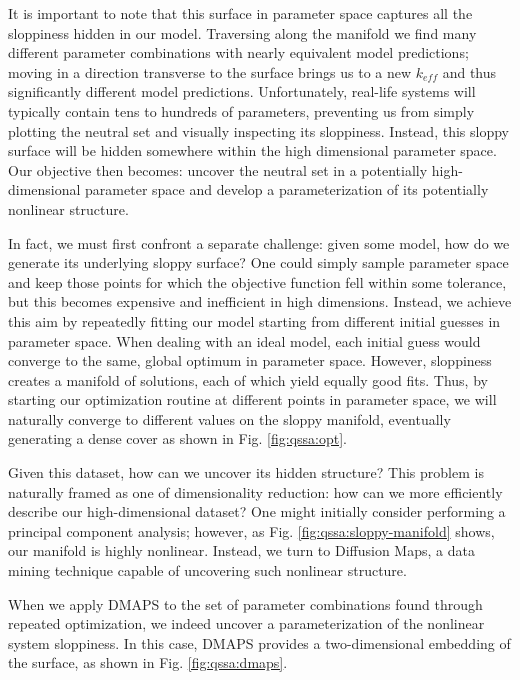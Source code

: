 \documentclass{article}
\begin{document}
It is important to note that this surface in parameter space captures
all the sloppiness hidden in our model. Traversing along the manifold we
find many different parameter combinations with nearly equivalent
model predictions; moving in a direction transverse to the surface
brings us to a new $k_{eff}$ and thus significantly different model
predictions. Unfortunately, real-life systems will typically contain
tens to hundreds of parameters, preventing us from simply plotting the
neutral set and visually inspecting its sloppiness. Instead, this
sloppy surface will be hidden somewhere within the high dimensional
parameter space. Our objective then becomes: uncover the neutral set
in a potentially high-dimensional parameter space and develop a
parameterization of its potentially nonlinear structure.

In fact, we must first confront a separate challenge: given some
model, how do we generate its underlying sloppy surface? One could
simply sample parameter space and keep those points for which the
objective function fell within some tolerance, but this becomes
expensive and inefficient in high dimensions. Instead, we achieve this
aim by repeatedly fitting our model starting from different initial
guesses in parameter space. When dealing with an ideal model, each
initial guess would converge to the same, global optimum in parameter
space. However, sloppiness creates a manifold of solutions, each of
which yield equally good fits. Thus, by starting our optimization
routine at different points in parameter space, we will naturally
converge to different values on the sloppy manifold, eventually
generating a dense cover as shown in Fig. \ref{fig:qssa:opt}.

Given this dataset, how can we uncover its hidden structure? This
problem is naturally framed as one of dimensionality reduction: how
can we more efficiently describe our high-dimensional dataset? One
might initially consider performing a principal component analysis;
however, as Fig. \ref{fig:qssa:sloppy-manifold} shows, our manifold is
highly nonlinear. Instead, we turn to Diffusion Maps, a data mining
technique capable of uncovering such nonlinear structure.


When we apply DMAPS to the set of parameter combinations found through
repeated optimization, we indeed uncover a parameterization of the
nonlinear system sloppiness. In this case, DMAPS provides a
two-dimensional embedding of the surface, as shown in
Fig. \ref{fig:qssa:dmaps}.
\end{document}
